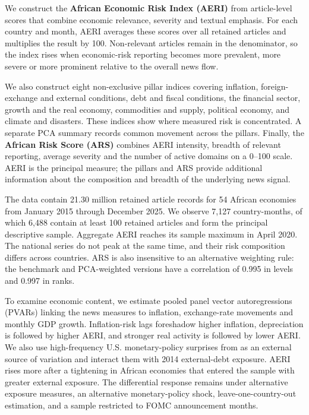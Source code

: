 \documentclass[12pt]{article}
\begin{document}
We construct the \textbf{African Economic Risk Index (AERI)} from article-level scores that combine economic relevance, severity and textual emphasis. For each country and month, AERI averages these scores over all retained articles and multiplies the result by 100. Non-relevant articles remain in the denominator, so the index rises when economic-risk reporting becomes more prevalent, more severe or more prominent relative to the overall news flow.

We also construct eight non-exclusive pillar indices covering inflation, foreign-exchange and external conditions, debt and fiscal conditions, the financial sector, growth and the real economy, commodities and supply, political economy, and climate and disasters. These indices show where measured risk is concentrated. A separate PCA summary records common movement across the pillars. Finally, the \textbf{African Risk Score (ARS)} combines AERI intensity, breadth of relevant reporting, average severity and the number of active domains on a 0--100 scale. AERI is the principal measure; the pillars and ARS provide additional information about the composition and breadth of the underlying news signal.

The data contain 21.30 million retained article records for 54 African economies from January 2015 through December 2025. We observe 7,127 country-months, of which 6,488 contain at least 100 retained articles and form the principal descriptive sample. Aggregate AERI reaches its sample maximum in April 2020. The national series do not peak at the same time, and their risk composition differs across countries. ARS is also insensitive to an alternative weighting rule: the benchmark and PCA-weighted versions have a correlation of 0.995 in levels and 0.997 in ranks.

To examine economic content, we estimate pooled panel vector autoregressions (PVARs) linking the news measures to inflation, exchange-rate movements and monthly GDP growth. Inflation-risk lags foreshadow higher inflation, depreciation is followed by higher AERI, and stronger real activity is followed by lower AERI. We also use high-frequency U.S. monetary-policy surprises from \citet{jarocinski2020} as an external source of variation and interact them with 2014 external-debt exposure. AERI rises more after a tightening in African economies that entered the sample with greater external exposure. The differential response remains under alternative exposure measures, an alternative monetary-policy shock, leave-one-country-out estimation, and a sample restricted to FOMC announcement months.
\end{document}
